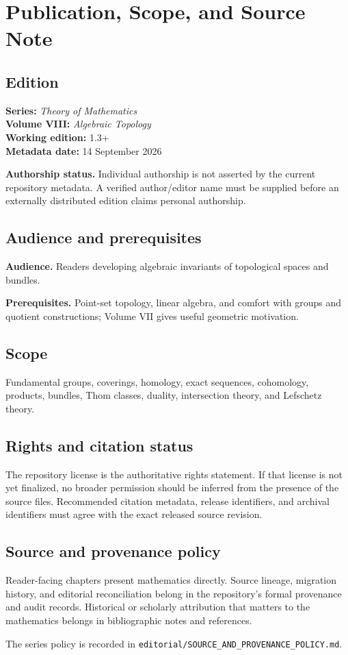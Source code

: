 \chapter*{Publication, Scope, and Source Note}
{}

\section*{Edition}
\textbf{Series:} \emph{Theory of Mathematics}\\
\textbf{Volume VIII:} \emph{Algebraic Topology}\\
\textbf{Working edition:} 1.3+\\
\textbf{Metadata date:} 14 September 2026

\textbf{Authorship status.} Individual authorship is not asserted by the current repository metadata. A verified author/editor name must be supplied before an externally distributed edition claims personal authorship.

\section*{Audience and prerequisites}
\textbf{Audience.} Readers developing algebraic invariants of topological spaces and bundles.

\textbf{Prerequisites.} Point-set topology, linear algebra, and comfort with groups and quotient constructions; Volume VII gives useful geometric motivation.

\section*{Scope}
Fundamental groups, coverings, homology, exact sequences, cohomology, products, bundles, Thom classes, duality, intersection theory, and Lefschetz theory.

\section*{Rights and citation status}
The repository license is the authoritative rights statement. If that license is
not yet finalized, no broader permission should be inferred from the presence of
the source files. Recommended citation metadata, release identifiers, and
archival identifiers must agree with the exact released source revision.

\section*{Source and provenance policy}
Reader-facing chapters present mathematics directly. Source lineage, migration
history, and editorial reconciliation belong in the repository's formal
provenance and audit records. Historical or scholarly attribution that matters
to the mathematics belongs in bibliographic notes and references.

The series policy is recorded in
\texttt{editorial/SOURCE\_AND\_PROVENANCE\_POLICY.md}.
